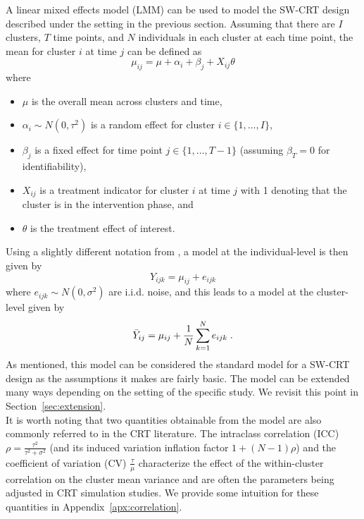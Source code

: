 \documentclass[10pt]{article}
\begin{document}
A linear mixed effects model (LMM) can be used to model the SW-CRT design described under the setting in the previous section. Assuming that there are $I$ clusters, $T$ time points, and $N$ individuals in each cluster at each time point, the mean for cluster $i$ at time $j$ can be defined as
\[
\mu_{ij} = \mu + \alpha_i + \beta_j + X_{ij}\theta
\]
where
\begin{itemize}

\item
$\mu$ is the overall mean across clusters and time,

\item
$\alpha_i\sim N(0,\tau^2)$ is a random effect for cluster $i\in\{1,\ldots,I\}$,

\item
$\beta_j$ is a fixed effect for time point $j\in\{1,\ldots,T-1\}$ (assuming $\beta_T=0$ for identifiability),

\item
$X_{ij}$ is a treatment indicator for cluster $i$ at time $j$ with 1 denoting that the cluster is in the intervention phase, and

\item
$\theta$ is the treatment effect of interest.

\end{itemize}
Using a slightly different notation from \citeauthor{Hussey:2007}, a model at the individual-level is then given by
\[
Y_{ijk} = \mu_{ij} + e_{ijk}
\]
where $e_{ijk}\sim N(0,\sigma^2)$ are i.i.d. noise, and this leads to a model at the cluster-level given by
\[
\bar{Y}_{ij} = \mu_{ij} + \frac{1}{N}\sum_{k=1}^Ne_{ijk} \;.
\]
As mentioned, this model can be considered the standard model for a SW-CRT design as the assumptions it makes are fairly basic. The model can be extended many ways depending on the setting of the specific study. We revisit this point in Section~\ref{sec:extension}.
\\

It is worth noting that two quantities obtainable from the model are also commonly referred to in the CRT literature. The intraclass correlation (ICC) $\rho=\frac{\tau^2}{\tau^2+\sigma^2}$ (and its induced variation inflation factor $1+(N-1)\rho$) and the coefficient of variation (CV) $\frac{\tau}{\mu}$ characterize the effect of the within-cluster correlation on the cluster mean variance and are often the parameters being adjusted in CRT simulation studies. We provide some intuition for these quantities in Appendix~\ref{apx:correlation}.
\end{document}
